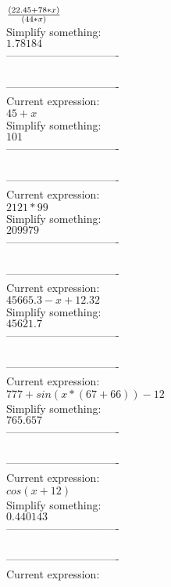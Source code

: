\documentclass[12pt]{article}
\begin{document}
\( {{(22.45+78*x)}\over{(44*x)}}\) \\
Simplify something:\\
\( 1.78184\) \\
-------------------------------\\
\\
-------------------------------\\
Current expression:\\
\( 45+x\) \\
Simplify something:\\
\( 101\) \\
-------------------------------\\
\\
-------------------------------\\
Current expression:\\
\( 2121*99\) \\
Simplify something:\\
\( 209979\) \\
-------------------------------\\
\\
-------------------------------\\
Current expression:\\
\( 45665.3-x+12.32\) \\
Simplify something:\\
\( 45621.7\) \\
-------------------------------\\
\\
-------------------------------\\
Current expression:\\
\( 777+sin(x*(67+66))-12\) \\
Simplify something:\\
\( 765.657\) \\
-------------------------------\\
\\
-------------------------------\\
Current expression:\\
\( cos(x+12)\) \\
Simplify something:\\
\( 0.440143\) \\
-------------------------------\\
\\
-------------------------------\\
Current expression:\\
\end{document}
